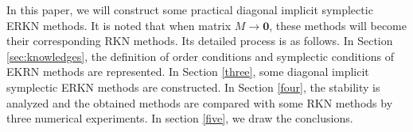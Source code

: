 \documentclass{article}
\begin{document}
In this paper, we will construct some practical  diagonal implicit
symplectic ERKN methods. It is noted that when matrix
$M\rightarrow\textbf{0}$, these methods will become their
corresponding RKN methods.  Its detailed process is as follows. In
Section \ref{sec:knowledges}, the definition of order conditions and
symplectic conditions of EKRN methods are represented. In Section
\ref{three}, some diagonal implicit symplectic ERKN methods are
constructed. In Section \ref{four}, the stability is analyzed and
 the  obtained methods are compared  with some
 RKN methods by three numerical experiments. In section \ref{five}, we draw the conclusions.
\end{document}
